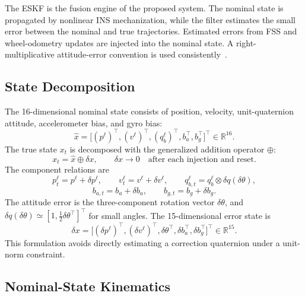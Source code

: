 \documentclass[]{IAC_style}
\begin{document}
The ESKF is the fusion engine of the proposed system. The nominal state is propagated by nonlinear INS mechanization, while the filter estimates the small error between the nominal and true trajectories. Estimated errors from FSS and wheel-odometry updates are injected into the nominal state. A right-multiplicative attitude-error convention is used consistently~\cite{lefferts1982kalman,sola2017quaternion,sveinsson2012insgps}.

\subsection{State Decomposition}

The 16-dimensional nominal state consists of position, velocity, unit-quaternion attitude, accelerometer bias, and gyro bias:
\begin{equation*}
\hat{x}=\bigl[(p^\ell)^{\top},(v^\ell)^{\top},(q_b^\ell)^{\top},b_a^{\top},b_g^{\top}\bigr]^{\top}\in\mathbb{R}^{16}.
\end{equation*}
The true state $x_t$ is decomposed with the generalized addition operator $\oplus$:
\begin{equation}
\tag{16}\label{eq:16}
x_t=\hat{x}\oplus\delta x,\qquad \delta x\rightarrow0\quad\text{after each injection and reset.}
\end{equation}
The component relations are
\begin{equation}
\tag{17}\label{eq:17}
p_t^\ell=p^\ell+\delta p^\ell,\qquad v_t^\ell=v^\ell+\delta v^\ell,\qquad q_{b,t}^\ell=q_b^\ell\otimes\delta q(\delta\theta),
\end{equation}
\begin{equation}
\tag{18}\label{eq:18}
b_{a,t}=b_a+\delta b_a,\qquad b_{g,t}=b_g+\delta b_g.
\end{equation}
The attitude error is the three-component rotation vector $\delta\theta$, and $\delta q(\delta\theta)\simeq[1,\tfrac12\delta\theta^\top]^\top$ for small angles. The 15-dimensional error state is
\begin{equation}
\tag{19}\label{eq:19}
\delta x=\bigl[(\delta p^\ell)^{\top},(\delta v^\ell)^{\top},\delta\theta^{\top},\delta b_a^{\top},\delta b_g^{\top}\bigr]^{\top}\in\mathbb{R}^{15}.
\end{equation}
This formulation avoids directly estimating a correction quaternion under a unit-norm constraint.

\subsection{Nominal-State Kinematics}
\end{document}
